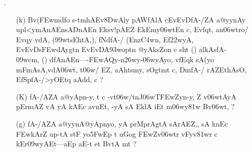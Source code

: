 \begin{itemize}
 \item[{\dn \dnnum \rn{17}}.]
                  \begin{itemize}
                   \item[({\dn k})]{\dn Bv(\3FEwmd\?fo s\2-tmhAEv\38DwAly\? pAWfAlA c\break EvEvDfA-/ZA a@yynAy\0 upl<ymAnAEn\break {}sADnAEn Ek\2sv!pAEZ EkEm\2y\306wtEn c{\rs ,\re} Evf\?qt, an\306wtro/\? Evqy\? v\?dA, {\rs (\re}\399w\4tsEhtA,{\rs ),\re} fNdfA-/ {\rs (\re}Enz\3C4w\?n{\rs ,\re} Ef\322wyA{\rs ,\re} EvEvD\break\-s\2\3FEwdAygt\?n EvEvDA\393wop\?t\?n @yAksZon c sht {\rs (\re}{\dn \dnnum {}}{\rs )\re} al\2kAsfA-\309wcm{\rs ,\re} {\rs (\re}{\dn \dnnum {}}{\rs )\re} dfA\0nAEn{\rs ----\re}\3FEwAQy{\rs -\re}n\326wy{\rs -\re}\306wyAyo{\rs ,\re} v\4f\?Eqk sA(yo mFmA\2sA{\rs ,\re}\break v\?dA\306wt, t\306w/\- EZ{\rs ,\re} aAh\0tsmy, sOgtmt\2 c{\rs ,\re} Dm\0fA-/ rAZ\?EthAsO{\rs ,\re} EfSpfA-/\break >yOEtq aAd\4d, c {\rs ?\re}} 
 
                   \item[({\dn K})] {\dn fA-/AZA a@yApn-y{\rs ,\re} t\? c -vt\306w/tnJ\306wT\-\3FEwZyn-y{\rs ,\re} Z\- v\306wtAyA\2 pErmAZ\? vA yA kAEc avnEt, -yA sA Ek\2lA iEt m\306wy\381w\? Bv\306wt, {\rs ?\re} }
 
                   \item[({\dn g})] {\dn fA-/AZA a@yynA@yApnyo, yA prMprAgtA\2 sArAEZ,{\rs ,\re} sA k\?nEc \3FEwkAr\?Z up-tA stF yo\35FwEp t uGog\2 \3FEwZv\306wtr\2 vFy\0v\381wr\2 c kEr\309wyAEt{\rs ---\re}aEp aE-t et BvtA mt {\rs ?\re}} 
 \end{itemize}
 \end{itemize}
 
